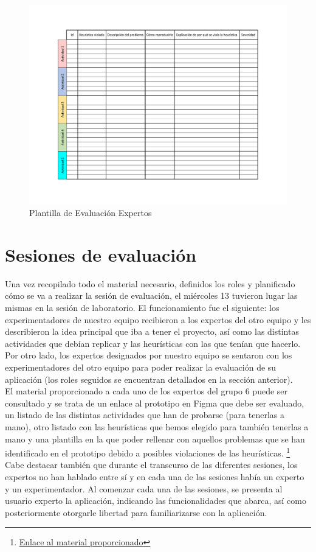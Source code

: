 \begin{figure}[h]
    \centering
    \includegraphics[width=1\textwidth]{Imagenes/Hito6/PlantillaEval.pdf}
    \caption{Plantilla de Evaluación Expertos}
    \label{fig:pla-exp}
\end{figure}

\section{Sesiones de evaluación}
Una vez recopilado todo el material necesario, definidos los roles y planificado cómo se va a realizar la sesión de evaluación, el miércoles 13 tuvieron lugar las mismas en la sesión de laboratorio. El funcionamiento fue el siguiente:
los experimentadores de nuestro equipo recibieron a los expertos del otro equipo y les describieron la idea principal que iba a tener el proyecto, así como las distintas actividades que debían replicar y las
heurísticas con las que tenían que hacerlo. Por otro lado, los expertos designados por nuestro equipo se sentaron con los experimentadores del otro equipo para poder realizar la evaluación de su aplicación (los
roles seguidos se encuentran detallados en la sección anterior). \\

El material proporcionado a cada uno de los expertos del grupo 6 puede ser consultado y se trata de un enlace al prototipo en Figma que debe ser evaluado, un listado de las distintas actividades que han de probarse
(para tenerlas a mano), otro listado con las heurísticas que hemos elegido para también tenerlas a mano y una plantilla en la que poder rellenar con aquellos problemas que se han identificado en el prototipo debido
a posibles violaciones de las heurísticas. \footnote{\href{https://drive.google.com/drive/folders/1WBsmnExJs_6jhmdTfktGOwBWZRp-Su1W?usp=drive_link}{Enlace al material proporcionado}} Cabe destacar también que
durante el transcurso de las diferentes sesiones, los expertos no han hablado entre sí y en cada una de las sesiones había un experto y un experimentador. Al comenzar cada una de las sesiones, se presenta al usuario experto
la aplicación, indicando las funcionalidades que abarca, así como posteriormente otorgarle libertad para familiarizarse con la aplicación. \\

